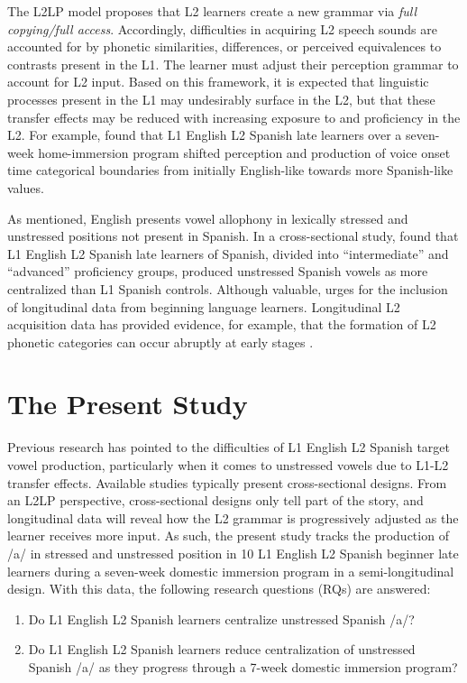 \documentclass[
  a4paper,
  11pt,
  twocolumn]{article}
\begin{document}
The L2LP model proposes that L2 learners create a new grammar via
\emph{full copying/full access}. Accordingly, difficulties in acquiring
L2 speech sounds are accounted for by phonetic similarities,
differences, or perceived equivalences to contrasts present in the L1.
The learner must adjust their perception grammar to account for L2
input. Based on this framework, it is expected that linguistic processes
present in the L1 may undesirably surface in the L2, but that these
transfer effects may be reduced with increasing exposure to and
proficiency in the L2. For example, \cite{casillas2016longitudinal}
found that L1 English L2 Spanish late learners over a seven-week
home-immersion program shifted perception and production of voice onset
time categorical boundaries from initially English-like towards more
Spanish-like values.

As mentioned, English presents vowel allophony in lexically stressed and
unstressed positions not present in Spanish. In a cross-sectional study,
\cite{cobb2015adult} found that L1 English L2 Spanish late learners of
Spanish, divided into ``intermediate'' and ``advanced'' proficiency
groups, produced unstressed Spanish vowels as more centralized than L1
Spanish controls. Although valuable, \cite{escudero2005linguistic} urges
for the inclusion of longitudinal data from beginning language learners.
Longitudinal L2 acquisition data has provided evidence, for example,
that the formation of L2 phonetic categories can occur abruptly at early
stages \cite{casillas2020phonetic}.

\section{The Present Study}

Previous research has pointed to the difficulties of L1 English L2
Spanish target vowel production, particularly when it comes to
unstressed vowels due to L1-L2 transfer effects. Available studies
typically present cross-sectional designs. From an L2LP perspective,
cross-sectional designs only tell part of the story, and longitudinal
data will reveal how the L2 grammar is progressively adjusted as the
learner receives more input. As such, the present study tracks the
production of /a/ in stressed and unstressed position in 10 L1 English
L2 Spanish beginner late learners during a seven-week domestic immersion
program in a semi-longitudinal design. With this data, the following
research questions (RQs) are answered:

\begin{enumerate}
\item Do L1 English L2 Spanish learners centralize unstressed Spanish /a/?
\item Do L1 English L2 Spanish learners reduce centralization of unstressed Spanish /a/ as they progress through a 7-week domestic immersion program?
\end{enumerate}
\end{document}
